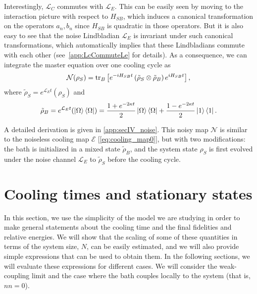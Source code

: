 \documentclass[aps,prx,twocolumn,superscriptaddress,nofootinbib,nolongbibliography,nobalancelastpage,10pt,floatfix]{revtex4-2}
\begin{document}
Interestingly, $\mathcal{L}_C$ commutes with $\mathcal{L}_E$. This can be easily seen by moving to the interaction picture with respect to $H_{SB}$, which induces a canonical transformation on the operators $a_n,b_n$ since $H_{SB}$ is quadratic in those operators. But it is also easy to see that the noise Lindbladian $\mathcal{L}_E$ is invariant under such canonical transformations, which automatically implies that these Lindbladians commute with each other (see~\cref{app:LcCommuteLe} for details). As a consequence, we can integrate the master equation over one cooling cycle as
\begin{equation}
    \mathcal{N}(\rho_S)= \operatorname{tr}_B\left[e^{-iH_{SB}t}\left(\tilde{\rho}_S \otimes \tilde{\rho}_B\right)e^{i H_{SB}t}\right],
    \label{eq:mapwithnoise}
\end{equation}
where $\tilde{\rho}_S = e^{\mathcal{L}_E t}(\rho_S)$ and
\begin{equation}
    \tilde{\rho}_B = e^{\mathcal{L}_E t}(\ket{\Omega}\bra{\Omega}) = \frac{1+e^{-2\kappa t}}{2}\ket{\Omega}\bra{\Omega}+\frac{1-e^{-2\kappa t}}{2}\ket{1}\bra{1}.
\end{equation}

A detailed derivation is given in \cref{app:secIV_noise}.
This noisy map $\mathcal{N}$ is similar to the noiseless cooling map $\mathcal{E}$ [\cref{eq:cooling_map0}], but with two modifications: the bath is initialized in a mixed state $\tilde{\rho}_B$, and the system state $\rho_S$ is first evolved under the noise channel $\mathcal{L}_E$ to $\tilde{\rho}_S$ before the cooling cycle.

\section{Cooling times and stationary states}
\label{sec:cooling_times_and_ss}

In this section, we use the simplicity of the model we are studying in order to make general statements about the cooling time and the final fidelities and relative energies. We will show that the scaling of some of these quantities in terms of the system size, $N$, can be easily estimated, and we will also provide simple expressions that can be used to obtain them.
In the following sections, we will evaluate these expressions for different cases. We will consider the weak-coupling limit and the case where the bath couples locally to the system (that is, $nn=0$).
\end{document}
